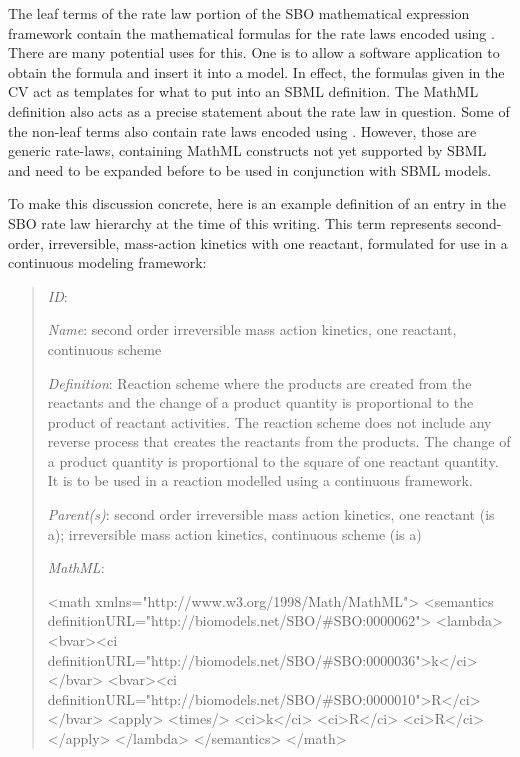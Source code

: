 The leaf terms of the rate law portion of the SBO mathematical
expression framework contain the mathematical formulas for the
rate laws encoded using \mathmltwo.  There are many potential uses
for this.  One is to allow a software application to obtain the
formula and insert it into a model.  In effect, the formulas given
in the CV act as templates for what to put into an SBML
\KineticLaw definition.  The MathML definition also acts as a
precise statement about the rate law in question. Some of the non-leaf terms also contain rate laws encoded using \mathmltwo. However, those are generic rate-laws, containing MathML constructs not yet supported by SBML and need to be expanded before to be used in conjunction with SBML models.

To make this discussion concrete, here is an example definition of
an entry in the SBO rate law hierarchy at the time of this
writing.  This term represents second-order, irreversible,
mass-action kinetics with one reactant, formulated for use in a
continuous modeling framework:
\begin{quote}
\begin{description}

\item \emph{ID}: 

\item \emph{Name}: second order irreversible mass action kinetics,
  one reactant, continuous scheme

\item \emph{Definition}: Reaction scheme where the products are created from the reactants and the change of a product quantity is proportional to the product of reactant activities. The reaction scheme does not include any reverse process that creates the reactants from the products. The change of a product quantity is proportional to the square of one reactant quantity. It is to be used in a reaction modelled using a continuous framework. 

\item \emph{Parent(s)}:  second order irreversible mass action kinetics, one reactant (is a);
 irreversible mass action kinetics, continuous scheme (is a)

\item \emph{MathML}:
\begin{example}
<math xmlns="http://www.w3.org/1998/Math/MathML">
    <semantics definitionURL="http://biomodels.net/SBO/#SBO:0000062">
        <lambda>
            <bvar><ci definitionURL="http://biomodels.net/SBO/#SBO:0000036">k</ci></bvar>
            <bvar><ci definitionURL="http://biomodels.net/SBO/#SBO:0000010">R</ci></bvar>
            <apply>
                <times/>
                <ci>k</ci>
                <ci>R</ci>
                <ci>R</ci>
            </apply>
        </lambda>
    </semantics>
</math>
\end{example}

\end{description}
\end{quote}

